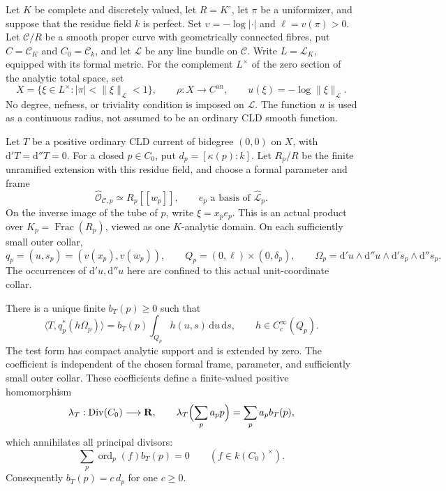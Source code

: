 \begin{proposition}
\label{prop:p213-torsor-residual-functional}
Let \(K\) be complete and discretely valued, let \(R=K^\circ\),
let \(\pi\) be a uniformizer, and suppose that the residue field
\(k\) is perfect. Set \(v=-\log|\cdot|\) and \(\ell=v(\pi)>0\).
Let \(\mathcal C/R\) be a smooth proper curve with geometrically
connected fibres, put \(C=\mathcal C_K\) and \(C_0=\mathcal C_k\),
and let \(\mathcal L\) be any line bundle on \(\mathcal C\).
Write \(L=\mathcal L_K\), equipped with its formal metric.
For the complement \(L^\times\) of the zero section of the
analytic total space, set
\[
 X=\{\xi\in L^\times:|\pi|<\|\xi\|_{\mathcal L}<1\},
 \qquad \rho:X\longrightarrow C^{\mathrm{an}},
 \qquad u(\xi)=-\log\|\xi\|_{\mathcal L}.
\]
No degree, nefness, or triviality condition is imposed on
\(\mathcal L\). The function \(u\) is used as a continuous
radius, not assumed to be an ordinary CLD smooth function.

Let \(T\) be a positive ordinary CLD current of bidegree
\((0,0)\) on \(X\), with \(\mathrm d'T=\mathrm d''T=0\).
For a closed \(p\in C_0\), put \(d_p=[\kappa(p):k]\).
Let \(R_p/R\) be the finite unramified extension with this
residue field, and choose a formal parameter and frame
\[
 \widehat{\mathcal O}_{\mathcal C,p}\simeq R_p[[w_p]],
 \qquad e_p\text{ a basis of }\widehat{\mathcal L}_p.
\]
On the inverse image of the tube of \(p\), write \(\xi=x_pe_p\).
This is an actual product over \(K_p=\operatorname{Frac}(R_p)\),
viewed as one \(K\)-analytic domain. On each sufficiently small
outer collar,
\[
 q_p=(u,s_p)=(v(x_p),v(w_p)),\qquad
 Q_p=(0,\ell)\times(0,\delta_p),\qquad
 \Omega_p=\mathrm d'u\wedge\mathrm d''u\wedge
                \mathrm d's_p\wedge\mathrm d''s_p.
\]
The occurrences of \(\mathrm d'u,\mathrm d''u\) here are confined
to this actual unit-coordinate collar.

There is a unique finite \(b_T(p)\geq0\) such that
\begin{equation}
\label{eq:p213-torsor-collar}
 \langle T,q_p^*(h\Omega_p)\rangle
    =b_T(p)\int_{Q_p}h(u,s)\,\mathrm du\,\mathrm ds,
 \qquad h\in C_c^\infty(Q_p).
\end{equation}
The test form has compact analytic support and is extended by
zero. The coefficient is independent of the chosen formal
frame, parameter, and sufficiently small outer collar. These
coefficients define a finite-valued positive homomorphism
\[
 \lambda_T:\operatorname{Div}(C_0)\longrightarrow\mathbf R,
 \qquad \lambda_T\Bigl(\sum_p a_pp\Bigr)=\sum_p a_pb_T(p),
\]
which annihilates all principal divisors:
\begin{equation}
\label{eq:p213-torsor-principal}
 \sum_p \operatorname{ord}_p(f)b_T(p)=0
       \qquad(f\in k(C_0)^\times).
\end{equation}
Consequently \(b_T(p)=c\,d_p\) for one \(c\geq0\).


\end{proposition}

